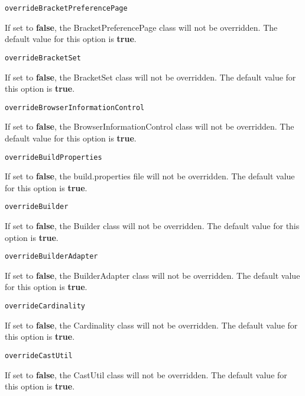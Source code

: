 \noindent\texttt{overrideBracketPreferencePage}
\begin{myindentpar}{1cm}
If set to \textbf{false}, the BracketPreferencePage class will not be overridden. The default value for this option is \textbf{true}.
\end{myindentpar}

\noindent\texttt{overrideBracketSet}
\begin{myindentpar}{1cm}
If set to \textbf{false}, the BracketSet class will not be overridden. The default value for this option is \textbf{true}.
\end{myindentpar}

\noindent\texttt{overrideBrowserInformationControl}
\begin{myindentpar}{1cm}
If set to \textbf{false}, the BrowserInformationControl class will not be overridden. The default value for this option is \textbf{true}.
\end{myindentpar}

\noindent\texttt{overrideBuildProperties}
\begin{myindentpar}{1cm}
If set to \textbf{false}, the build.properties file will not be overridden. The default value for this option is \textbf{true}.
\end{myindentpar}

\noindent\texttt{overrideBuilder}
\begin{myindentpar}{1cm}
If set to \textbf{false}, the Builder class will not be overridden. The default value for this option is \textbf{true}.
\end{myindentpar}

\noindent\texttt{overrideBuilderAdapter}
\begin{myindentpar}{1cm}
If set to \textbf{false}, the BuilderAdapter class will not be overridden. The default value for this option is \textbf{true}.
\end{myindentpar}

\noindent\texttt{overrideCardinality}
\begin{myindentpar}{1cm}
If set to \textbf{false}, the Cardinality class will not be overridden. The default value for this option is \textbf{true}.
\end{myindentpar}

\noindent\texttt{overrideCastUtil}
\begin{myindentpar}{1cm}
If set to \textbf{false}, the CastUtil class will not be overridden. The default value for this option is \textbf{true}.
\end{myindentpar}

